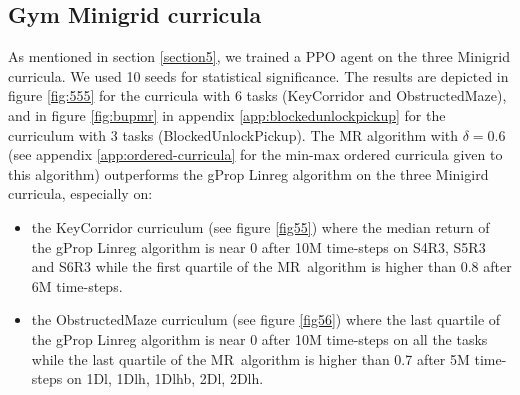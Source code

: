 \documentclass{article}
\begin{document}
\subsection{Gym Minigrid curricula}
\label{section54}
As mentioned in section \ref{section5}, we trained a PPO agent on the three Minigrid curricula. We used 10 seeds for statistical significance. The results are depicted in figure \ref{fig:555} for the curricula with 6 tasks (KeyCorridor and ObstructedMaze), and in figure \ref{fig:bupmr} in appendix \ref{app:blockedunlockpickup} for the curriculum with 3 tasks (BlockedUnlockPickup).
The MR algorithm with \(\delta = 0.6\)  (see appendix \ref{app:ordered-curricula} for the min-max ordered curricula given to this algorithm) outperforms the gProp Linreg algorithm on the three Minigird curricula, especially on:
\begin{itemize}
\item
the KeyCorridor curriculum (see figure \ref{fig55}) where the median return of the gProp Linreg algorithm is near 0 after 10M time-steps on S4R3, S5R3 and S6R3 while the first quartile of the MR\ algorithm is higher than 0.8 after 6M time-steps.
\item the ObstructedMaze curriculum (see figure \ref{fig56}) where the last quartile of the gProp Linreg algorithm is near 0 after 10M time-steps on all the tasks while the last quartile of the MR\ algorithm is higher than 0.7 after 5M time-steps on 1Dl, 1Dlh, 1Dlhb, 2Dl, 2Dlh.
\end{itemize}
\end{document}
